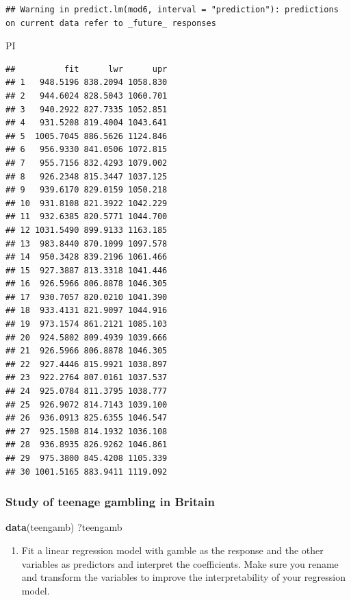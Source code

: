 \documentclass[]{article}
\newenvironment{Shaded}{\begin{snugshade}}{\end{snugshade}}
\newcommand{\KeywordTok}[1]{\textcolor[rgb]{0.13,0.29,0.53}{\textbf{#1}}}
\newcommand{\NormalTok}[1]{#1}
\providecommand{\tightlist}{%
  \setlength{\itemsep}{0pt}\setlength{\parskip}{0pt}}
\begin{document}
\begin{verbatim}
## Warning in predict.lm(mod6, interval = "prediction"): predictions on current data refer to _future_ responses
\end{verbatim}

\begin{Shaded}
\begin{Highlighting}[]
\NormalTok{PI}
\end{Highlighting}
\end{Shaded}

\begin{verbatim}
##          fit      lwr      upr
## 1   948.5196 838.2094 1058.830
## 2   944.6024 828.5043 1060.701
## 3   940.2922 827.7335 1052.851
## 4   931.5208 819.4004 1043.641
## 5  1005.7045 886.5626 1124.846
## 6   956.9330 841.0506 1072.815
## 7   955.7156 832.4293 1079.002
## 8   926.2348 815.3447 1037.125
## 9   939.6170 829.0159 1050.218
## 10  931.8108 821.3922 1042.229
## 11  932.6385 820.5771 1044.700
## 12 1031.5490 899.9133 1163.185
## 13  983.8440 870.1099 1097.578
## 14  950.3428 839.2196 1061.466
## 15  927.3887 813.3318 1041.446
## 16  926.5966 806.8878 1046.305
## 17  930.7057 820.0210 1041.390
## 18  933.4131 821.9097 1044.916
## 19  973.1574 861.2121 1085.103
## 20  924.5802 809.4939 1039.666
## 21  926.5966 806.8878 1046.305
## 22  927.4446 815.9921 1038.897
## 23  922.2764 807.0161 1037.537
## 24  925.0784 811.3795 1038.777
## 25  926.9072 814.7143 1039.100
## 26  936.0913 825.6355 1046.547
## 27  925.1508 814.1932 1036.108
## 28  936.8935 826.9262 1046.861
## 29  975.3800 845.4208 1105.339
## 30 1001.5165 883.9411 1119.092
\end{verbatim}

\subsubsection{Study of teenage gambling in
Britain}\label{study-of-teenage-gambling-in-britain}

\begin{Shaded}
\begin{Highlighting}[]
\KeywordTok{data}\NormalTok{(teengamb)}
\NormalTok{?teengamb}
\end{Highlighting}
\end{Shaded}

\begin{enumerate}
\def\labelenumi{\arabic{enumi}.}
\tightlist
\item
  Fit a linear regression model with gamble as the response and the
  other variables as predictors and interpret the coefficients. Make
  sure you rename and transform the variables to improve the
  interpretability of your regression model.
\end{enumerate}
\end{document}
